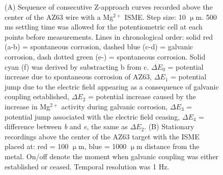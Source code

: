 \documentclass[3p]{elsarticle}
\providecommand{\DIFadd}[1]{{\protect\color{blue}#1}} %
\providecommand{\DIFaddFL}[1]{\DIFadd{#1}} %
\providecommand{\DIFaddbeginFL}{} %
\providecommand{\DIFaddendFL}{} %
\begin{document}
\begin{figure}
\caption{(A) Sequence of consecutive Z-approach curves recorded above the center of the AZ63 wire with a Mg$^{2+}$ ISME. Step size: 10 $\upmu$m. 500 ms settling time was allowed for the potentiometric cell at each points before measurements. Lines in chronological order: solid red \DIFaddbeginFL \DIFaddFL{(a-b) }\DIFaddendFL = spontaneous corrosion, dashed blue \DIFaddbeginFL \DIFaddFL{(c-d) }\DIFaddendFL = galvanic corrosion, dash dotted green \DIFaddbeginFL \DIFaddFL{(e-) }\DIFaddendFL = spontaneous corrosion. \DIFaddbeginFL \DIFaddFL{Solid cyan (f) was derived by substracting b from c. $\Delta E_0$ = potential increase due to spontaneous corrosion of AZ63, $\Delta E_1$ = potential jump due to the electric field appearing as a consequence of galvanic coupling established, $\Delta E_2$ = potential increase caused by the increase in Mg$^{2+}$ activity during galvanic corrosion, $\Delta E_3$ = potential jump associated with the electric field ceasing, $\Delta E_4$ = difference between }\emph{\DIFaddFL{b}} \DIFaddFL{and }\emph{\DIFaddFL{e}}\DIFaddFL{, the same as $\Delta E_2$. }\DIFaddendFL (B) Stationary recordings above the center of the AZ63 target with the ISME placed at: red = 100 $\upmu$m, blue = 1000 $\upmu$m distance from the metal. On/off denote the moment when galvanic coupling was either established or ceased. Temporal resolution was 1 Hz.}
\label{fig:approach}
\end{figure}
\end{document}
